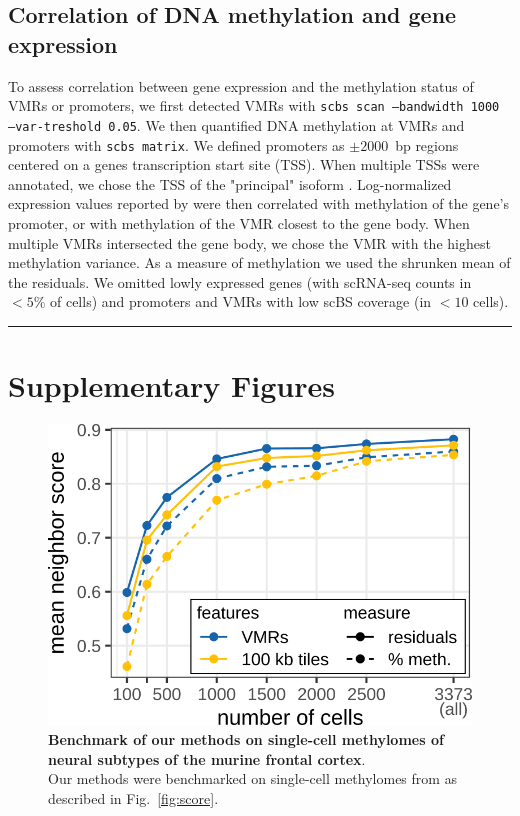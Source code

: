 \documentclass[twocolumn,10pt]{article}
\begin{document}
\subsection{Correlation of DNA methylation and gene expression}
To assess correlation between gene expression and the methylation status of VMRs or promoters, we
first detected VMRs with \texttt{scbs scan --bandwidth 1000 --var-treshold 0.05}.
We then quantified DNA methylation at VMRs and promoters with \texttt{scbs matrix}.
We defined promoters as $\pm2000$~bp regions centered on a genes transcription start site (TSS).
When multiple TSSs were annotated, we chose the TSS of the "principal" isoform \citep{appris}.
Log-normalized expression values reported by \citet{kremer_scnmt} were then correlated with methylation of the gene's promoter, or with methylation of the VMR closest to the gene body.
When multiple VMRs intersected the gene body, we chose the VMR with the highest methylation variance.
As a measure of methylation we used the shrunken mean of the residuals.
We omitted lowly expressed genes (with scRNA-seq counts in $<5\%$ of cells) and promoters and VMRs with low scBS coverage (in $<10$ cells).




\vspace{1.4ex}
\noindent\hfil\rule{.6\columnwidth}{.2pt}\hfil


{\small }

\newpage
\section{Supplementary Figures}

\setcounter{figure}{0}
\renewcommand{\thefigure}{S\arabic{figure}}

\begin{figure}
    \begin{center}
        \includegraphics[width=0.8\columnwidth]{figures/SFig_benchmark.png}
    \end{center}
    \caption{\small \textbf{Benchmark of our methods on single-cell methylomes of neural subtypes of the murine frontal cortex}.\\
    Our methods were benchmarked on single-cell methylomes from \citet{luo2017single} as described in Fig.~\ref{fig:score}.
    }
    \label{fig:score_luo}
\end{figure}
\end{document}
